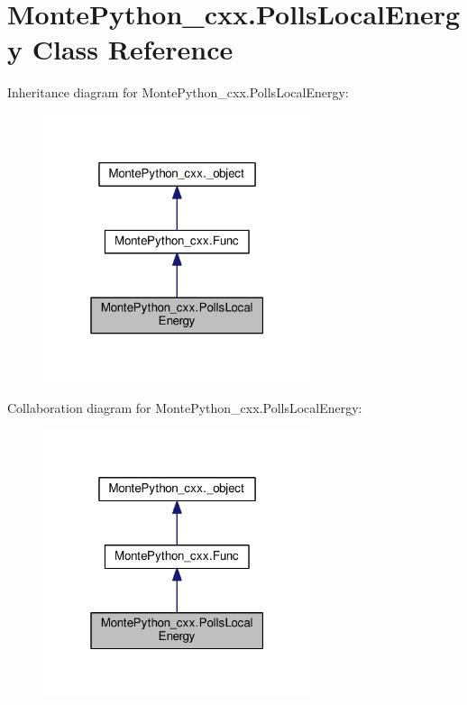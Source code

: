 \hypertarget{classMontePython__cxx_1_1PollsLocalEnergy}{}\section{Monte\+Python\+\_\+cxx.\+Polls\+Local\+Energy Class Reference}
\label{classMontePython__cxx_1_1PollsLocalEnergy}


Inheritance diagram for Monte\+Python\+\_\+cxx.\+Polls\+Local\+Energy\+:
\nopagebreak
\begin{figure}[H]
\begin{center}
\leavevmode
\includegraphics[width=223pt]{classMontePython__cxx_1_1PollsLocalEnergy__inherit__graph}
\end{center}
\end{figure}


Collaboration diagram for Monte\+Python\+\_\+cxx.\+Polls\+Local\+Energy\+:
\nopagebreak
\begin{figure}[H]
\begin{center}
\leavevmode
\includegraphics[width=223pt]{classMontePython__cxx_1_1PollsLocalEnergy__coll__graph}
\end{center}
\end{figure}
